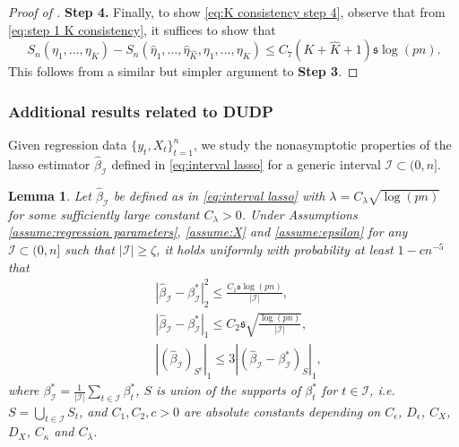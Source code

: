 \documentclass[11pt]{article}
\newcommand{\I}{{\mathcal I }}
\newcommand{\s}{ { \mathfrak{s}  } }
\theoremstyle{plain}
\newtheorem{lemma}[theorem]{Lemma}
\theoremstyle{definition}
\begin{document}
\begin{proof}[Proof of ]
{\bf Step 4.}
Finally, to show \eqref{eq:K consistency step 4}, observe that from \eqref{eq:step 1 K consistency}, it suffices to show that 
	\[
		S_n(\eta_1,\ldots,\eta_K)  -  S_n ( \widehat \eta_{1},\ldots, \widehat \eta_{\widehat K } , \eta_1,\ldots,\eta_K )  \le C_7 (K+\widehat K+1) \s \log(pn).
	\]
	This follows from a similar but simpler argument to {\bf Step 3}.
\end{proof}  

\subsubsection{Additional results related to DUDP}

Given regression data $\{ y_t, X_t\}_{t=1}^n$, we study the nonasymptotic properties of the lasso estimator $\widehat \beta_ \I$ defined in \eqref{eq:interval lasso} for a generic interval  $\mathcal I \subset (0, n] $.
 
\begin{lemma} \label{lemma:interval lasso} 
 Let $\widehat \beta_ \I $ be defined as in  \eqref{eq:interval lasso} with 
    $\lambda = C_\lambda \sqrt { \log(pn) }$ for some sufficiently large constant $C _ \lambda > 0$. Under Assumptions \ref{assume:regression parameters}, \ref{assume:X} and \ref{assume:epsilon}
for any $ \mathcal I  \subset (0, n] $   such that 
$ | \mathcal I | \ge   \zeta$, it holds uniformly with probability at least $1 - cn^{-5}$ that 
\begin{align} \label{eq:lemma:interval lasso term 1}
&    | \widehat \beta_\I -\beta^*_\I  | _2^2 \le \frac{C_1 \s\log(pn)}{ |\I|  },
 \\\label{eq:lemma:interval lasso term 2}
 &     | \widehat \beta_\I  -\beta^*_\I  | _1  \le     C_2  \s\sqrt {  \frac{\log(p n )} {|\I|  } },
 \\\label{eq:lemma:interval lasso term 3}
 &     | (\widehat \beta_\I  )_{S^c} | _1 \le  3  | (\widehat \beta _\I  -\beta^*_\I )_{S }  | _1,
\end{align} 
where $ \beta^*_\I  = \frac{1}{|\I|} \sum_{  t \in \I } \beta^*_t  $, $S $ is union of the  supports of $\beta_t^* $ for $t\in \I$, i.e.~$S = \bigcup_{t \in \I}S_t$, and $C_1, C_2, c > 0$ are absolute constants depending on $C_\epsilon$, $D_{\epsilon}$, $C_X$, $D_{X}$, $C_{\kappa}$ and $C_{\lambda}$.
 \end{lemma} 
 

 
\end{document}
